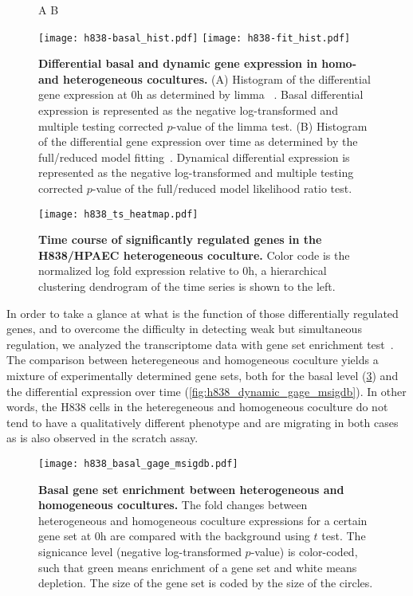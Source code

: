 \begin{figure}[!ht]
\hskip 0.5in A \hskip 2.5in B
\begin{center}
\texttt{[image: h838-basal\_hist.pdf]}
\texttt{[image: h838-fit\_hist.pdf]}
\end{center}
\caption[Differential basal and dynamic gene expression]{
{\bf Differential basal and dynamic gene expression in homo- and heterogeneous 
cocultures.} 
(A) Histogram of the differential gene expression at 0h as determined by limma~%
\citep{Smyth2004}. 
Basal differential expression is 
represented as the negative log-transformed and multiple
testing corrected $p$-value of the limma test.
(B) Histogram of the differential gene expression over time as determined by the
full/reduced model fitting~\citep{Mar2009}.
Dynamical differential expression is 
represented as the negative log-transformed and multiple
testing corrected $p$-value of the full/reduced model
likelihood ratio test.
}
\label{fig:h838_transcriptome}
\end{figure}

\begin{figure}[!ht]
\begin{center}
\texttt{[image: h838\_ts\_heatmap.pdf]}
\end{center}
\caption[Gene expression time course in the H838/HPAEC coculture]{
{\bf Time course of significantly regulated genes in the H838/HPAEC heterogeneous coculture.} 
Color code is the normalized log fold expression relative to 0h, a hierarchical
clustering dendrogram of the time series is shown to the left.
}
\label{fig:h838_ts}
\end{figure}

In order to take a glance at what is the function of those
differentially regulated genes, and to overcome the difficulty in detecting weak
but simultaneous regulation, we analyzed the transcriptome data with gene set
enrichment test~\citep{Luo2009}.
The comparison between heteregeneous and homogeneous coculture yields 
a mixture of experimentally determined gene sets, both for the basal level
(\ref{fig:h838_basal_gage_msigdb})
and the differential expression over time (\ref{fig:h838_dynamic_gage_msigdb}).
In other words, the H838 cells in the heteregeneous and homogeneous coculture
do not tend to have a qualitatively different phenotype and are migrating in
both cases as is also observed in the scratch assay.

\begin{figure}[!ht]
\begin{center}
\texttt{[image: h838\_basal\_gage\_msigdb.pdf]}
\end{center}
\caption[Basal gene set enrichment]{
{\bf Basal gene set enrichment between heterogeneous and homogeneous cocultures.} 
The fold changes between heterogeneous and homogeneous coculture expressions 
for a certain gene set at 0h are compared with the background using $t$ test.
The signicance level (negative log-transformed $p$-value) is color-coded, such
that green means enrichment of a gene set and white means depletion. The size
of the gene set is coded by the size of the circles.
}
\label{fig:h838_basal_gage_msigdb}
\end{figure}


